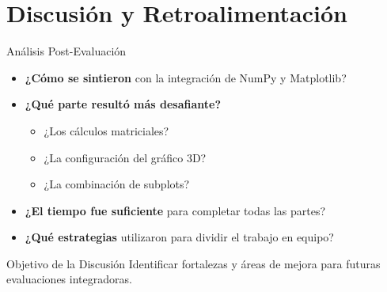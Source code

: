 \documentclass[10pt]{beamer}
\begin{document}
\section{Discusión y Retroalimentación}

\begin{frame}{Análisis Post-Evaluación}
  \begin{itemize}
    \item \textbf{¿Cómo se sintieron} con la integración de NumPy y Matplotlib?
    \item \textbf{¿Qué parte resultó más desafiante?}
      \begin{itemize}
        \item ¿Los cálculos matriciales?
        \item ¿La configuración del gráfico 3D?
        \item ¿La combinación de subplots?
      \end{itemize}
    \item \textbf{¿El tiempo fue suficiente} para completar todas las partes?
    \item \textbf{¿Qué estrategias} utilizaron para dividir el trabajo en equipo?
  \end{itemize}
  
  \begin{block}{Objetivo de la Discusión}
    Identificar fortalezas y áreas de mejora para futuras evaluaciones integradoras.
  \end{block}
\end{frame}
\end{document}
